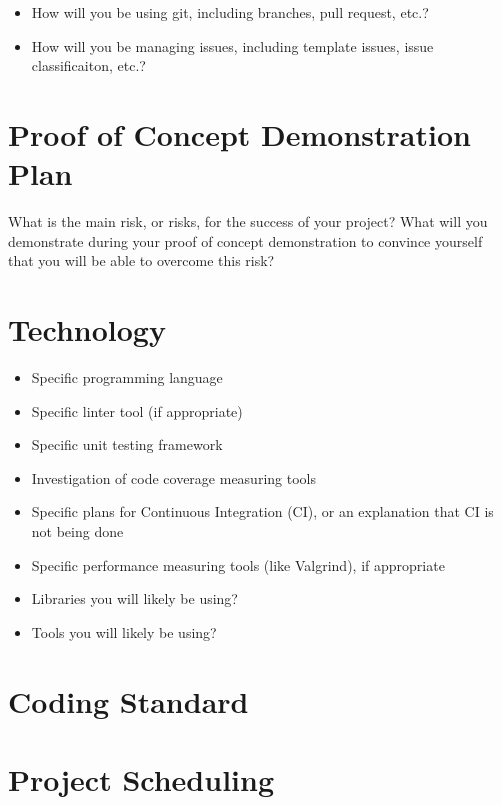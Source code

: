 \documentclass{article}
\begin{document}
\begin{itemize}
	\item How will you be using git, including branches, pull request, etc.?
	\item How will you be managing issues, including template issues, issue
	classificaiton, etc.?
\end{itemize}

\section{Proof of Concept Demonstration Plan}

What is the main risk, or risks, for the success of your project?  What will you
demonstrate during your proof of concept demonstration to convince yourself that
you will be able to overcome this risk?

\section{Technology}

\begin{itemize}
\item Specific programming language
\item Specific linter tool (if appropriate)
\item Specific unit testing framework
\item Investigation of code coverage measuring tools
\item Specific plans for Continuous Integration (CI), or an explanation that CI
  is not being done
\item Specific performance measuring tools (like Valgrind), if
  appropriate
\item Libraries you will likely be using?
\item Tools you will likely be using?
\end{itemize}

\section{Coding Standard}

\section{Project Scheduling}

\end{document}
